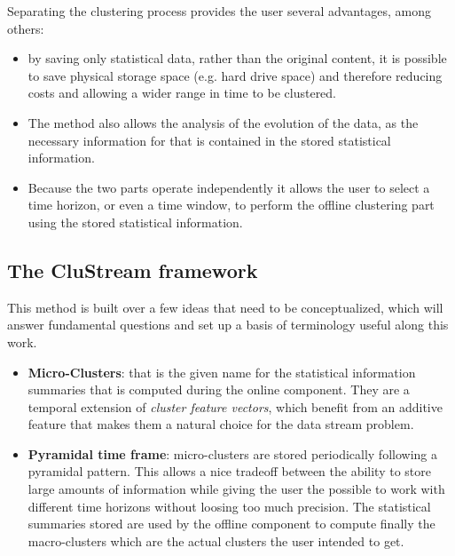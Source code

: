 Separating the clustering process provides the user several advantages, among others:

\begin{itemize}
 \item by saving only statistical data, rather than the original content, it is possible to save physical storage space (e.g. hard drive space) and therefore reducing costs and allowing a wider range in time to be clustered.
 
 \item The method also allows the analysis of the evolution of the data, as the necessary information for that is contained in the stored statistical information.
 
 \item Because the two parts operate independently it allows the user to select a time horizon, or even a time window, to perform the offline clustering part using the stored statistical information.
\end{itemize}

\subsection{The CluStream framework}

This method is built over a few ideas that need to be conceptualized, which will answer fundamental questions and set up a basis of terminology useful along this work.

\begin{itemize}
 \item \textbf{Micro-Clusters}: that is the given name for the statistical information summaries that is computed during the online component. They are a temporal extension of \textit{cluster feature vectors}\cite{zhang96birch}, which benefit from an additive feature that makes them a natural choice for the data stream problem\cite{clustreamOrig}.
 
 \item \textbf{Pyramidal time frame}: micro-clusters are stored periodically following a pyramidal pattern. This allows a nice tradeoff between the ability to store large amounts of information while giving the user the possible to work with different time horizons without loosing too much precision. The statistical summaries stored are used by the offline component to compute finally the macro-clusters which are the actual clusters the user intended to get.
\end{itemize}

